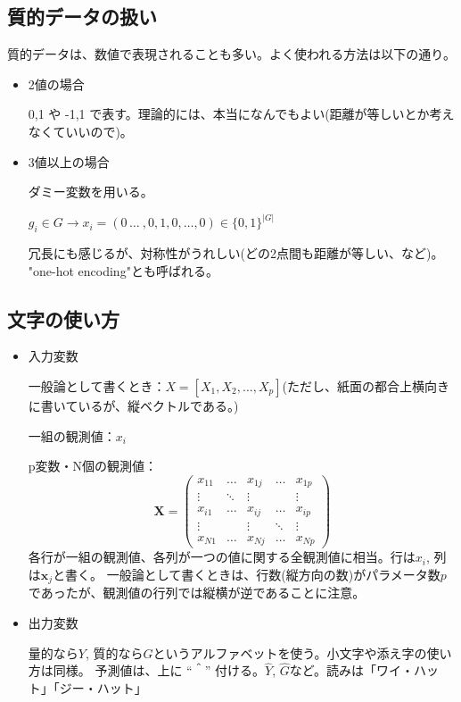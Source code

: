 \documentclass[uplatex]{jsarticle}
\begin{document}
\subsection{質的データの扱い}
質的データは、数値で表現されることも多い。よく使われる方法は以下の通り。

\begin{itemize}

  \item 2値の場合

  0,1 や -1,1 で表す。理論的には、本当になんでもよい(距離が等しいとか考えなくていいので)。

  \item 3値以上の場合

  ダミー変数を用いる。

  $g_i \in G \to x_i = ( 0 \, \dots \ , 0, 1, 0, \dots ,0 ) \in \{0,1\}^{|G|}$

  冗長にも感じるが、対称性がうれしい(どの2点間も距離が等しい、など)。
  "one-hot encoding"とも呼ばれる。
\end{itemize}

\subsection{文字の使い方}
\begin{itemize}

  \item 入力変数

  一般論として書くとき：$X=[X_1, X_2, \dots , X_p]$(ただし、紙面の都合上横向きに書いているが、縦ベクトルである。)

  一組の観測値：$x_i$

  p変数・N個の観測値：
  \[
    \mathbf{X} = \left(
      \begin{array}{ccccc}
        x_{11} & \dots & x_{1j} & \dots & x_{1p} \\
        \vdots & \ddots & \vdots & \ & \vdots \\
        x_{i1} & \dots  & x_{ij} & \dots & x_{ip} \\
        \vdots & \ & \vdots & \ddots & \vdots \\
        x_{N1} & \dots & x_{Nj} & \dots & x_{Np}
      \end{array}
    \right)
  \]
  各行が一組の観測値、各列が一つの値に関する全観測値に相当。行は$x_i$, 列は$\mathbf{x}_j$と書く。
  一般論として書くときは、行数(縦方向の数)がパラメータ数$p$であったが、観測値の行列では縦横が逆であることに注意。
  \item 出力変数

  量的なら$Y$, 質的なら$G$というアルファベットを使う。小文字や添え字の使い方は同様。
  予測値は、上に ``＾'' 付ける。$\hat{Y}$, $\hat{G}$など。読みは「ワイ・ハット」「ジー・ハット」
\end{itemize}
\end{document}
